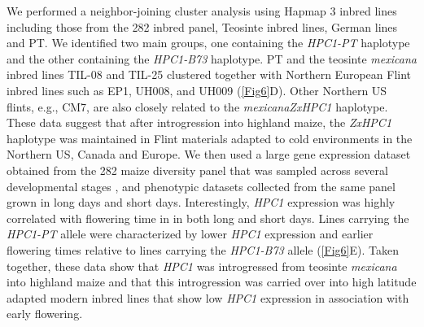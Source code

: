\documentclass[9pt,twocolumn,twoside,lineno]{biorxiv}
\newcommand{\mex}{\textit{mexicana}\xspace}
\newcommand{\hpc}{\textit{HPC1}\xspace}
\begin{document}
We performed a neighbor-joining cluster analysis using Hapmap 3 \cite{Bukowski2017-ng} inbred lines including those from the 282 inbred panel, Teosinte inbred lines, German lines and PT. 
We identified two main groups, one containing the \textit{HPC1-PT} haplotype and the other containing the \textit{HPC1-B73} haplotype.
PT and the teosinte \mex inbred lines TIL-08 and TIL-25 clustered together with Northern European Flint inbred lines such as EP1, UH008, and UH009 (\cref{Fig6}D). 
Other Northern US flints, e.g., CM7, are also closely related to the \mex \textit{ZxHPC1} haplotype. 
These data suggest that after introgression into highland maize, the \textit{ZxHPC1} haplotype was maintained in Flint materials adapted to cold environments in the Northern US, Canada and Europe. 
We then used a large gene expression dataset obtained from the 282 maize diversity panel that was sampled across several developmental stages \cite{Kremling2018-gn}, and phenotypic datasets collected from the same panel grown in long days and short days.
Interestingly, \hpc expression was highly correlated with flowering time in in both long and short days. 
Lines carrying the \textit{HPC1-PT} allele were characterized by lower \hpc expression and earlier flowering times relative to lines carrying the \textit{HPC1-B73} allele (\cref{Fig6}E).
Taken together, these data show that \hpc was introgressed from teosinte \mex into highland maize and that this introgression was carried over into high latitude adapted modern inbred lines that show low \hpc expression in association with early flowering.
\end{document}
